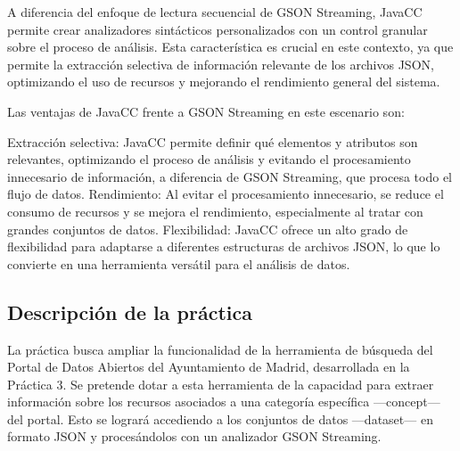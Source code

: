 
 \noindent A diferencia del enfoque de lectura secuencial de GSON Streaming, JavaCC permite crear analizadores sintácticos personalizados con un control granular sobre el proceso de análisis. Esta característica es crucial en este contexto, ya que permite la extracción selectiva de información relevante de los archivos JSON, optimizando el uso de recursos y mejorando el rendimiento general del sistema.

Las ventajas de JavaCC frente a GSON Streaming en este escenario son:

Extracción selectiva: JavaCC permite definir qué elementos y atributos son relevantes, optimizando el proceso de análisis y evitando el procesamiento innecesario de información, a diferencia de GSON Streaming, que procesa todo el flujo de datos.
Rendimiento: Al evitar el procesamiento innecesario, se reduce el consumo de recursos y se mejora el rendimiento, especialmente al tratar con grandes conjuntos de datos.
Flexibilidad: JavaCC ofrece un alto grado de flexibilidad para adaptarse a diferentes estructuras de archivos JSON, lo que lo convierte en una herramienta versátil para el análisis de datos.

\subsection{Descripción de la práctica}

\noindent La práctica busca ampliar la funcionalidad de la herramienta de búsqueda del Portal de Datos Abiertos del Ayuntamiento de Madrid, desarrollada en la Práctica 3. Se pretende dotar a esta herramienta de la capacidad para extraer información sobre los recursos asociados a una categoría específica ---concept--- del portal. Esto se logrará accediendo a los conjuntos de datos ---dataset--- en formato JSON y procesándolos con un analizador GSON Streaming.


